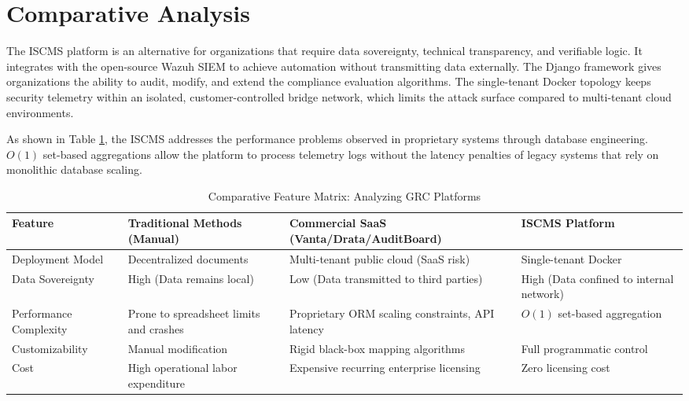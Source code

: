 \section{Comparative Analysis}
The ISCMS platform is an alternative for organizations that require data sovereignty, technical transparency, and verifiable logic. It integrates with the open-source Wazuh SIEM to achieve automation without transmitting data externally. The Django framework gives organizations the ability to audit, modify, and extend the compliance evaluation algorithms. The single-tenant Docker topology keeps security telemetry within an isolated, customer-controlled bridge network, which limits the attack surface compared to multi-tenant cloud environments.

As shown in Table \ref{tab:comparative_matrix}, the ISCMS addresses the performance problems observed in proprietary systems through database engineering. $O(1)$ set-based aggregations allow the platform to process telemetry logs without the latency penalties of legacy systems that rely on monolithic database scaling.

\begin{table}[htbp]
    \centering
    \caption{Comparative Feature Matrix: Analyzing GRC Platforms}
    \label{tab:comparative_matrix}
    \renewcommand{\arraystretch}{1.5}
    \small
    \begin{tabular}{|p{}|p{}|p{}|p{}|}
        \hline
        \textbf{Feature} & \textbf{Traditional Methods (Manual)} & \textbf{Commercial SaaS (Vanta/Drata/AuditBoard)} & \textbf{ISCMS Platform} \\
        \hline
        Deployment Model & Decentralized documents & Multi-tenant public cloud (SaaS risk) & Single-tenant Docker \\
        \hline
        Data Sovereignty & High (Data remains local) & Low (Data transmitted to third parties) & High (Data confined to internal network) \\
        \hline
        Performance Complexity & Prone to spreadsheet limits and crashes & Proprietary ORM scaling constraints, API latency & $O(1)$ set-based aggregation \\
        \hline
        Customizability & Manual modification & Rigid black-box mapping algorithms & Full programmatic control \\
        \hline
        Cost & High operational labor expenditure & Expensive recurring enterprise licensing & Zero licensing cost \\
        \hline
    \end{tabular}
\end{table}

